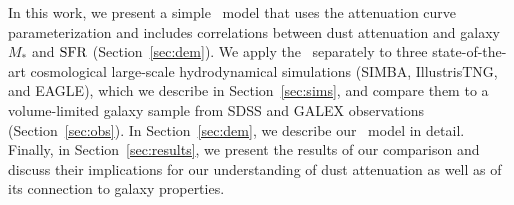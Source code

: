 In this work, we present a simple \eda~model that uses the \cite{noll2009}
attenuation curve parameterization and includes correlations between dust
attenuation and galaxy $M_*$ and ${\rm SFR}$ (Section~\ref{sec:dem}). We apply 
the \eda~separately to three state-of-the-art cosmological large-scale hydrodynamical 
simulations (SIMBA, IllustrisTNG, and EAGLE), which we describe in
Section~\ref{sec:sims}, and compare them to a volume-limited galaxy sample from SDSS
and GALEX observations (Section~\ref{sec:obs}). In Section~\ref{sec:dem}, we
describe our \eda~model in detail. Finally, in Section~\ref{sec:results}, we
present the results of our comparison and discuss their implications for our
understanding of dust attenuation as well as of its connection to galaxy properties. 
